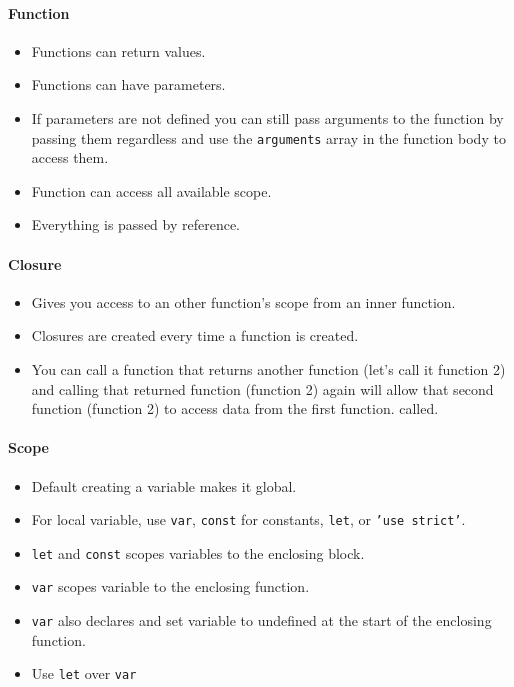 \documentclass[../CMPUT-404-Notes.tex]{subfiles}
\begin{document}
\paragraph{Function}
\begin{itemize}
  \item Functions can return values.
  \item Functions can have parameters.
  \item If parameters are not defined you can still pass arguments to the function by passing them regardless and use the \texttt{arguments} array in the function body to access them. 
  \item Function can access all available scope.
  \item Everything is passed by reference.
\end{itemize}
\paragraph{Closure}
\begin{itemize}
  \item Gives you access to an other function's scope from an inner function. 
  \item Closures are created every time a function is created.
  \item You can call a function that returns another function (let's call it function 2) and calling that returned function (function 2) again will allow that second function (function 2) to access data from the first function. called.   
\end{itemize}
\paragraph{Scope}
\begin{itemize}
  \item Default creating a variable makes it global.
  \item For local variable, use \texttt{var}, \texttt{const} for constants, \texttt{let}, or \texttt{'use strict'}.
  \item \texttt{let} and \texttt{const} scopes variables to the enclosing block.
  \item \texttt{var} scopes variable to the enclosing function.
  \item \texttt{var} also declares and set variable to undefined at the start of the enclosing function. 
  \item Use \texttt{let} over \texttt{var}
\end{itemize}
\end{document}
